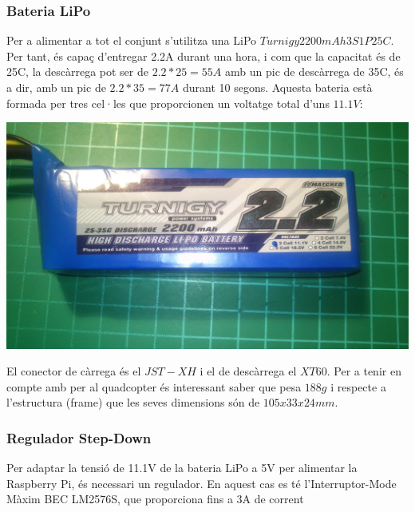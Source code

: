 \documentclass[twoside]{article}
\begin{document}
\subsubsection*{Bateria LiPo}
Per a alimentar a tot el conjunt s'utilitza una LiPo $Turnigy 2200mAh 3S1P 25C$. Per tant, és capaç d'entregar 2.2A durant una hora, i com que la capacitat és de 25C, la descàrrega pot ser de $2.2*25=55A$ amb un pic de descàrrega de 35C, és a dir, amb un pic de $2.2*35=77A$ durant 10 segons. Aquesta bateria està formada per tres cel·les que proporcionen un voltatge total d'uns $11.1V$:\\
\begin{center}
\includegraphics[scale=0.1,viewport=0 400 2560 1250,clip]{images/LiPo.jpg} \\
\end{center}
El conector de càrrega és el $JST-XH$ i el de descàrrega el $XT60$. Per a tenir en compte amb per al quadcopter és interessant saber que pesa $188g$ i respecte a l'estructura (frame) que les seves dimensions són de $105x33x24mm$.

\subsubsection*{Regulador Step-Down}
Per adaptar la tensió de 11.1V de la bateria LiPo a 5V per alimentar la Raspberry Pi, és necessari un regulador. En aquest cas es té l'Interruptor-Mode Màxim BEC LM2576S, que proporciona fins a 3A de corrent \cite{lm2576s}\\
\end{document}
